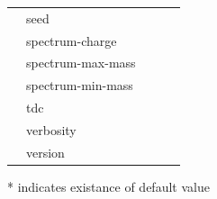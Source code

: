 \documentclass{article}
\begin{document}
\begin{table}
\begin{tabular}{lllll}
                     &seed                              &                                 &                                 &                                 \\
                     &spectrum-charge                   &                                 &                                 &                                 \\
                     &spectrum-max-mass                 &                                 &                                 &                                 \\
                     &spectrum-min-mass                 &                                 &                                 &                                 \\
                     &tdc                               &                                 &                                 &                                 \\
                     &verbosity                         &                                 &                                 &                                 \\
                     &version                           &                                 &                                 &                                 
\end{tabular}
\end{table}
* indicates existance of default value
\end{document}
